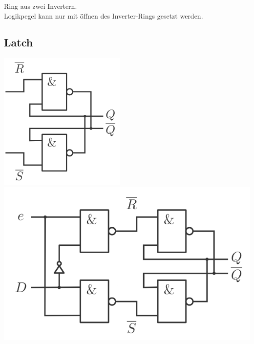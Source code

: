 \documentclass[6pt,a4paper]{scrartcl}
\begin{document}
\begin{multicols*}{3}
\begin{minipage}{0.15\textwidth}
	\end{minipage}
	\begin{minipage}{0.15\textwidth}
			Ring aus zwei Invertern.\\
			Logikpegel kann nur mit öffnen des Inverter-Rings gesetzt werden.
	\end{minipage}

	\subsection{Latch}
	\begin{minipage}{0.35\linewidth}
		\includegraphics[width=\linewidth]{img/logic/rs-latch}
		\includegraphics[width=\linewidth]{img/logic/enable-latch}

\end{minipage}
\end{multicols*}
\end{document}
